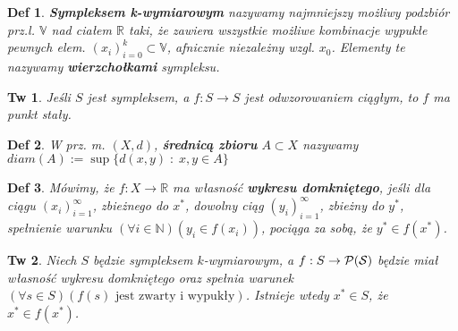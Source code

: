 \documentclass[8pt]{extarticle}
\theoremstyle{mystyle}
\newtheorem{definicja}{Def}
\newtheorem{twierdzenie}{Tw}
\newcommand{\bb}{\mathbb}
\begin{document}
\begin{multicols*}{4}
    \begin{definicja}
        \textbf{Sympleksem k-wymiarowym} nazywamy najmniejszy możliwy podzbiór prz.l. $\bb{V}$ nad ciałem $\bb{R}$ taki,
        że zawiera wszystkie możliwe kombinacje wypukłe pewnych elem. ${(x_i)}_{i=0}^{k} \subset \bb{V}$,
         afnicznie niezależny wzgl. $x_0$.
        Elementy te nazywamy \textbf{wierzchołkami} sympleksu.
    \end{definicja}

    \begin{twierdzenie}
        Jeśli $S$ jest sympleksem, a $f: S \rightarrow S$ jest odwzorowaniem ciągłym, to $f$ ma punkt stały.
    \end{twierdzenie}

    \begin{definicja}
        W prz. m. $(X, d)$, \textbf{średnicą zbioru} $A \subset X$ nazywamy $diam(A) := \sup{\{d(x,y)\;:\; x, y \in A\}}$
    \end{definicja}

    \begin{definicja}
        Mówimy, że $f: X \rightarrow \bb{R}$ ma własność \textbf{wykresu domkniętego}, jeśli dla ciągu ${(x_i)_{i=1}^{\infty}}$, 
        zbieżnego do $x^*$, dowolny ciąg ${(y_i)_{i=1}^{\infty}}$, zbieżny do $y^*$, spełnienie warunku $(\forall i \in \bb{N})(y_i \in f(x_i))$,
        pociąga za sobą, że $y^* \in f(x^*)$.
    \end{definicja}

    \begin{twierdzenie}
        Niech $S$ będzie sympleksem $k$-wymiarowym, a $f: S \rightarrow \cal{P}(S)$ będzie miał własność wykresu domkniętego
        oraz spełnia warunek $(\forall s \in S)(f(s) \text{ jest zwarty i wypukły})$.
        Istnieje wtedy $x^* \in S$, że $x^* \in f(x^*)$.
    \end{twierdzenie}
\end{multicols*}
\end{document}
